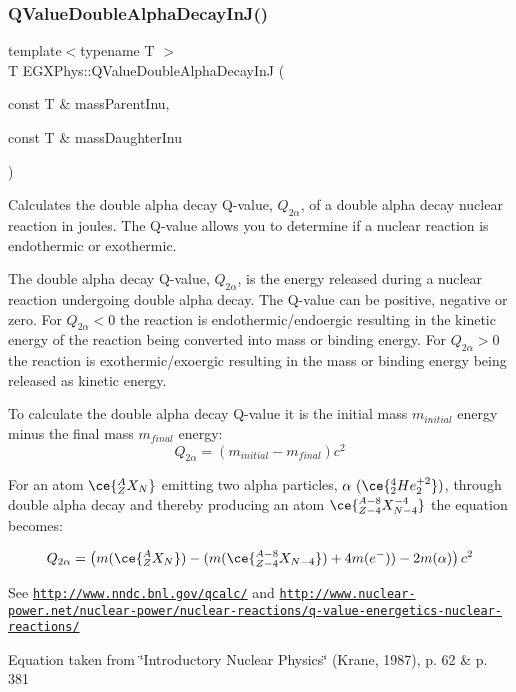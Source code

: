 \subsubsection{\texorpdfstring{Q\+Value\+Double\+Alpha\+Decay\+In\+J()}{QValueDoubleAlphaDecayInJ()}}
{\footnotesize\ttfamily template$<$typename T $>$ \\
T E\+G\+X\+Phys\+::\+Q\+Value\+Double\+Alpha\+Decay\+InJ (\begin{DoxyParamCaption}\item[{const T \&}]{mass\+Parent\+Inu,  }\item[{const T \&}]{mass\+Daughter\+Inu }\end{DoxyParamCaption})}



Calculates the double alpha decay Q-\/value, $Q_{2\alpha}$, of a double alpha decay nuclear reaction in joules. The Q-\/value allows you to determine if a nuclear reaction is endothermic or exothermic. 

The double alpha decay Q-\/value, $Q_{2\alpha}$, is the energy released during a nuclear reaction undergoing double alpha decay. The Q-\/value can be positive, negative or zero. For $Q_{2\alpha} < 0$ the reaction is endothermic/endoergic resulting in the kinetic energy of the reaction being converted into mass or binding energy. For $Q_{2\alpha} > 0$ the reaction is exothermic/exoergic resulting in the mass or binding energy being released as kinetic energy.

To calculate the double alpha decay Q-\/value it is the initial mass $m_{initial}$ energy minus the final mass $m_{final}$ energy\+: \[Q_{2\alpha} = \left ( m_{initial}-m_{final}\right ) c^2\]

For an atom $\ce{ ^{A}_{Z}X_{N} }$ emitting two alpha particles, $\alpha\ (\ce{ ^{4}_{2}He^{+2}_{2} })$, through double alpha decay and thereby producing an atom $\ce{ ^{A-8}_{Z{-4}}X^{-4}_{N-4} }$ the equation becomes\+:

\[Q_{2\alpha} = \left ( m(\ce{ ^{A}_{Z}X_{N} }) - (m(\ce{ ^{A-8}_{Z{-4}}X_{N-4} }) + 4m(e^-)) - 2m(\alpha)\right ) c^2\]

See \href{http://www.nndc.bnl.gov/qcalc/}{\tt http\+://www.\+nndc.\+bnl.\+gov/qcalc/} and \href{http://www.nuclear-power.net/nuclear-power/nuclear-reactions/q-value-energetics-nuclear-reactions/}{\tt http\+://www.\+nuclear-\/power.\+net/nuclear-\/power/nuclear-\/reactions/q-\/value-\/energetics-\/nuclear-\/reactions/}

Equation taken from \char`\"{}\+Introductory Nuclear Physics\char`\"{} (Krane, 1987), p. 62 \& p. 381


